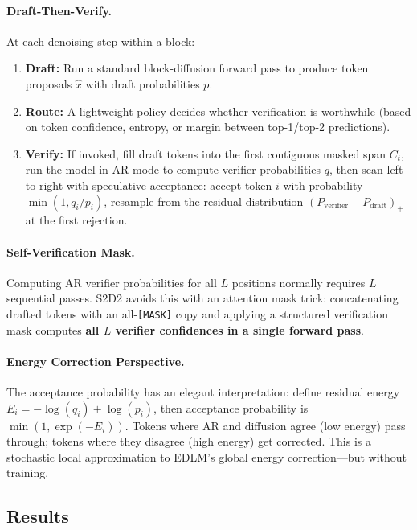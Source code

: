 \documentclass[11pt]{article}
\begin{document}
\paragraph{Draft-Then-Verify.}
At each denoising step within a block:
\begin{enumerate}
    \item \textbf{Draft:} Run a standard block-diffusion forward pass to produce token proposals $\hat{x}$ with draft probabilities $p$.
    \item \textbf{Route:} A lightweight policy decides whether verification is worthwhile (based on token confidence, entropy, or margin between top-1/top-2 predictions).
    \item \textbf{Verify:} If invoked, fill draft tokens into the first contiguous masked span $C_t$, run the model in AR mode to compute verifier probabilities $q$, then scan left-to-right with speculative acceptance: accept token $i$ with probability $\min(1, q_i / p_i)$, resample from the residual distribution $(P_{\mathrm{verifier}} - P_{\mathrm{draft}})_+$ at the first rejection.
\end{enumerate}

\paragraph{Self-Verification Mask.}
Computing AR verifier probabilities for all $L$ positions normally requires $L$ sequential passes. S2D2 avoids this with an attention mask trick: concatenating drafted tokens with an all-\texttt{[MASK]} copy and applying a structured verification mask computes \textbf{all $L$ verifier confidences in a single forward pass}.

\paragraph{Energy Correction Perspective.}
The acceptance probability has an elegant interpretation: define residual energy $E_i = -\log(q_i) + \log(p_i)$, then acceptance probability is $\min(1, \exp(-E_i))$. Tokens where AR and diffusion agree (low energy) pass through; tokens where they disagree (high energy) get corrected. This is a stochastic local approximation to EDLM's global energy correction---but without training.

\subsection{Results}
\end{document}
